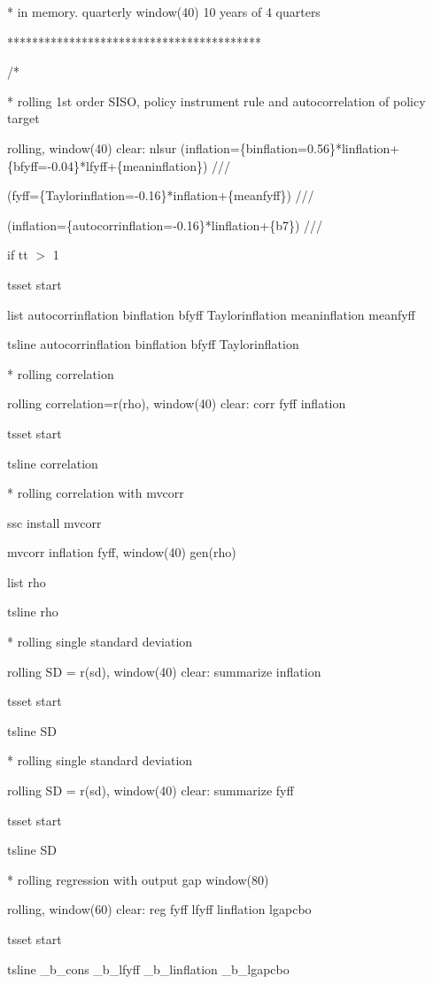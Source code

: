 \documentclass[12pt,a4paper]{article}%
\begin{document}
* in memory. quarterly window(40) 10 years of 4 quarters

*****************************************

/*

* rolling 1st order SISO, policy instrument rule and autocorrelation of policy target

rolling, window(40) clear: nlsur
(inflation=\{binflation=0.56\}*linflation+\{bfyff=-0.04\}*lfyff+\{meaninflation\})
///

(fyff=\{Taylorinflation=-0.16\}*inflation+\{meanfyff\}) ///

(inflation=\{autocorrinflation=-0.16\}*linflation+\{b7\}) ///

if tt%
$>$%
1

tsset start

list autocorrinflation binflation bfyff Taylorinflation meaninflation meanfyff

tsline autocorrinflation binflation bfyff Taylorinflation

* rolling correlation

rolling correlation=r(rho), window(40) clear: corr fyff inflation

tsset start

tsline correlation

* rolling correlation with mvcorr

ssc install mvcorr

mvcorr inflation fyff, window(40) gen(rho)

list rho

tsline rho

* rolling single standard deviation

rolling SD = r(sd), window(40) clear: summarize inflation

tsset start\qquad

tsline SD

* rolling single standard deviation

rolling SD = r(sd), window(40) clear: summarize fyff

tsset start

tsline SD

* rolling regression with output gap window(80)

rolling, window(60) clear: reg fyff lfyff linflation lgapcbo

tsset start

tsline \_b\_cons \_b\_lfyff \_b\_linflation \_b\_lgapcbo
\end{document}
